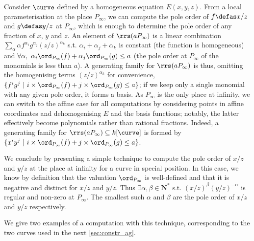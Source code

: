 Consider $\curve$ defined by a homogeneous equation $E(x,y,z)$. From a local parameterisation at the place $P_\infty$, we can compute the pole order of
$f \defas x/z$ and $g \defas y/z$ at $P_\infty$, which is enough to determine the pole
order of any fraction of $x$, $y$ and $z$.
An element of $\rrs(aP_\infty)$ is a linear combination $\sum_\alpha \alpha f^{\alpha_i}g^{\alpha_j}(z/z)^{\alpha_k}$ s.t. $\alpha_i + \alpha_j + \alpha_k$ is constant (the function is
homogeneous) and $\forall \alpha,~\alpha_i\ord_{P_\infty}(f) + \alpha_j\ord_{P_\infty}(g) \leq a$ (the pole order at $P_\infty$ of the monomials is less
than $a$).
A generating family for $\rrs(aP_\infty)$ is thus, omitting the homogenising terms $(z/z)^{\alpha_k}$ for convenience, $\{f^ig^j~|~i\times\ord_{P_\infty}(f) + j\times\ord_{P_\infty}(g) \leq a\}$; if we keep only a single monomial
with any given pole order, it forms a basis.
As $P_\infty$ is the only place at infinity, we can switch to the affine case for all computations by considering points in affine coordinates and dehomogenising $E$ and the basis functions; notably, the latter effectively become polynomials rather
than rational fractions. Indeed, a generating family
for $\rrs(aP_\infty) \subseteq k[\curve]$ is formed by $\{x^iy^j~|~i\times\ord_{P_\infty}(f) + j\times\ord_{P_\infty}(g) \leq a\}$.

\medskip

We conclude by presenting a simple technique to compute the pole order of $x/z$ and $y/z$ at the place at infinity for a curve in special position.
In this case, we know by definition that the valuation $\ord_{P_\infty}$ is well-defined and that it is negative and distinct for $x/z$ and $y/z$.
Thus $\exists \alpha,\beta \in \mathbf{N}^*$ s.t. $(x/z)^\beta(y/z)^{-\alpha}$ is regular and non-zero at $P_\infty$. The smallest such $\alpha$
and $\beta$ are the pole order of $x/z$ and $y/z$ respectively.

We give two examples of a computation with this technique, corresponding to the two curves used in the next \autoref{sec:constr_ag}.


